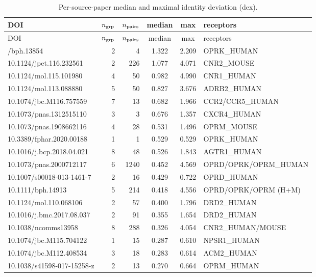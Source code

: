 \documentclass[11pt]{article}
\begin{document}
\begin{longtable}{p{5.9cm} r r c c p{4.1cm}}
\caption{Per-source-paper median and maximal identity deviation (dex).}
\label{tab:atlas}\\
\toprule
DOI & $n_{\rm grp}$ & $n_{\rm pairs}$ & median & max & receptors \\
\midrule
\endfirsthead
\toprule
DOI & $n_{\rm grp}$ & $n_{\rm pairs}$ & median & max & receptors \\
\midrule
\endhead
\bottomrule
\endfoot
10.1111/bph.13854 & 2 & 4 & 1.322 & 2.209 & OPRK\_\allowbreak{}HUMAN \\
10.1124/jpet.116.232561 & 2 & 226 & 1.077 & 4.071 & CNR2\_\allowbreak{}MOUSE \\
10.1124/mol.115.101980 & 4 & 50 & 0.982 & 4.990 & CNR1\_\allowbreak{}HUMAN \\
10.1124/mol.113.088880 & 5 & 50 & 0.827 & 3.676 & ADRB2\_\allowbreak{}HUMAN \\
10.1074/jbc.M116.757559 & 7 & 13 & 0.682 & 1.966 & CCR2/CCR5\_\allowbreak{}HUMAN \\
10.1073/pnas.1312515110 & 3 & 3 & 0.676 & 1.357 & CXCR4\_\allowbreak{}HUMAN \\
10.1073/pnas.1908662116 & 4 & 28 & 0.531 & 1.496 & OPRM\_\allowbreak{}MOUSE \\
10.3389/fphar.2020.00188 & 1 & 1 & 0.529 & 0.529 & OPRK\_\allowbreak{}HUMAN \\
10.1016/j.bcp.2018.04.021 & 8 & 48 & 0.526 & 1.843 & AGTR1\_\allowbreak{}HUMAN \\
10.1073/pnas.2000712117 & 6 & 1240 & 0.452 & 4.569 & OPRD/OPRK/OPRM\_\allowbreak{}HUMAN \\
10.1007/s00018-013-1461-7 & 2 & 16 & 0.429 & 0.722 & OPRD\_\allowbreak{}HUMAN \\
10.1111/bph.14913 & 5 & 214 & 0.418 & 4.556 & OPRD/OPRK/OPRM (H+M) \\
10.1124/mol.110.068106 & 2 & 57 & 0.400 & 1.796 & DRD2\_\allowbreak{}HUMAN \\
10.1016/j.bmc.2017.08.037 & 2 & 91 & 0.355 & 1.654 & DRD2\_\allowbreak{}HUMAN \\
10.1038/ncomms13958 & 8 & 288 & 0.326 & 4.054 & CNR2\_\allowbreak{}HUMAN/MOUSE \\
10.1074/jbc.M115.704122 & 1 & 15 & 0.287 & 0.610 & NPSR1\_\allowbreak{}HUMAN \\
10.1074/jbc.M112.408534 & 3 & 18 & 0.283 & 0.614 & ACM2\_\allowbreak{}HUMAN \\
10.1038/s41598-017-15258-z & 2 & 13 & 0.270 & 0.664 & OPRM\_\allowbreak{}HUMAN \\

\end{longtable}
\end{document}
